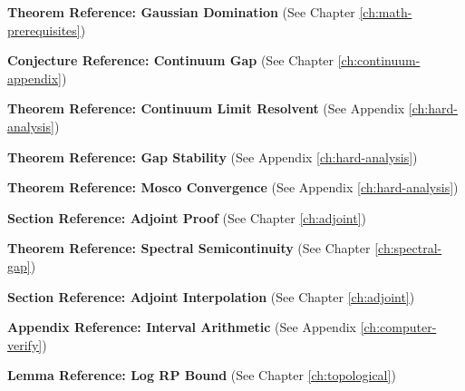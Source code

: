 \label{thm:gaussian-domination}
\textbf{Theorem Reference: Gaussian Domination} (See Chapter \ref{ch:math-prerequisites})

\label{conj:continuum-gap}
\textbf{Conjecture Reference: Continuum Gap} (See Chapter \ref{ch:continuum-appendix})

\label{thm:continuum_limit_resolvent}
\textbf{Theorem Reference: Continuum Limit Resolvent} (See Appendix \ref{ch:hard-analysis})

\label{thm:gap_stability}
\textbf{Theorem Reference: Gap Stability} (See Appendix \ref{ch:hard-analysis})

\label{thm:mosco_convergence}
\textbf{Theorem Reference: Mosco Convergence} (See Appendix \ref{ch:hard-analysis})

\label{sec:adjoint-proof}
\textbf{Section Reference: Adjoint Proof} (See Chapter \ref{ch:adjoint})

\label{thm:spectral-semicontinuity}
\textbf{Theorem Reference: Spectral Semicontinuity} (See Chapter \ref{ch:spectral-gap})

\label{sec:adjoint-interpolation}
\textbf{Section Reference: Adjoint Interpolation} (See Chapter \ref{ch:adjoint})

\label{app:interval-arithmetic}
\textbf{Appendix Reference: Interval Arithmetic} (See Appendix \ref{ch:computer-verify})

\label{lem:log-rp-bound}
\textbf{Lemma Reference: Log RP Bound} (See Chapter \ref{ch:topological})

